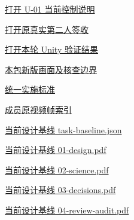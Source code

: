 \documentclass[11pt,a4paper]{article}
\begin{document}
\href{file:///D:/Agent/srp/agent/tasks/U-01/outputs/current-control-contract.md}{打开 U-\allowbreak{}01 当前控制说明}


\href{file:///D:/Agent/srp/agent/validation/U-01_\%E7\%AC\%AC\%E4\%BA\%8C\%E4\%BA\%BA\%E5\%AE\%A1\%E6\%A0\%B8\%E6\%8A\%A5\%E5\%91\%8A_\%E5\%B7\%B2\%E7\%AD\%BE\%E7\%BD\%B2.md}{打开原真实第二人签收}


\href{file:///D:/Agent/srp/agent/tasks/U-01/evidence/verification.json}{打开本轮 Unity 验证结果}


\href{file:///D:/Agent/srp/agent/tasks/U-01/outputs/current-implementation-evidence.md}{本包新版画面及核查边界}


\href{file:///D:/Agent/srp/agent/design/weather/2026-10-08_Storm\%E4\%B8\%8E\%E7\%BA\%AF\%E7\%B2\%92\%E5\%AD\%90\%E5\%8F\%8C\%E7\%8E\%AF\%E5\%AE\%9E\%E6\%96\%BD\%E6\%A0\%87\%E5\%87\%86.md}{统一实施标准}


\href{file:///D:/Agent/srp/human/assets/previews/2026-10-08/member-storm-particle-rings/frame-index.json}{成员原视频帧索引}


\href{file:///D:/Agent/srp/agent/design/design-foundation-20261008/task-baseline.json}{当前设计基线 task-\allowbreak{}baseline.json}


\href{file:///D:/Agent/srp/agent/design/design-foundation-20261008/01-design.pdf}{当前设计基线 01-\allowbreak{}design.pdf}


\href{file:///D:/Agent/srp/agent/design/design-foundation-20261008/02-science.pdf}{当前设计基线 02-\allowbreak{}science.pdf}


\href{file:///D:/Agent/srp/agent/design/design-foundation-20261008/03-decisions.pdf}{当前设计基线 03-\allowbreak{}decisions.pdf}


\href{file:///D:/Agent/srp/agent/design/design-foundation-20261008/04-review-audit.pdf}{当前设计基线 04-\allowbreak{}review-\allowbreak{}audit.pdf}
\end{document}
